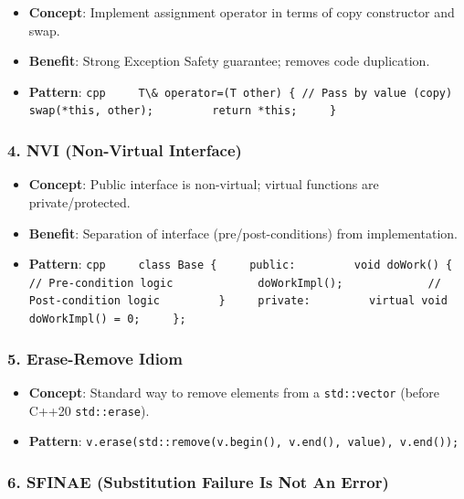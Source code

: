\begin{itemize}
\tightlist
\item
  \textbf{Concept}: Implement assignment operator in terms of copy
  constructor and swap.
\item
  \textbf{Benefit}: Strong Exception Safety guarantee; removes code
  duplication.
\item
  \textbf{Pattern}:
  \passthrough{\lstinline!cpp     T\& operator=(T other) \{ // Pass by value (copy)         swap(*this, other);         return *this;     \}!}
\end{itemize}

\hypertarget{nvi-non-virtual-interface}{%
\subsubsection{4. NVI (Non-Virtual
Interface)}\label{nvi-non-virtual-interface}}

\begin{itemize}
\tightlist
\item
  \textbf{Concept}: Public interface is non-virtual; virtual functions
  are private/protected.
\item
  \textbf{Benefit}: Separation of interface (pre/post-conditions) from
  implementation.
\item
  \textbf{Pattern}:
  \passthrough{\lstinline!cpp     class Base \{     public:         void doWork() \{             // Pre-condition logic             doWorkImpl();             // Post-condition logic         \}     private:         virtual void doWorkImpl() = 0;     \};!}
\end{itemize}

\hypertarget{erase-remove-idiom}{%
\subsubsection{5. Erase-Remove Idiom}\label{erase-remove-idiom}}

\begin{itemize}
\tightlist
\item
  \textbf{Concept}: Standard way to remove elements from a
  \passthrough{\lstinline!std::vector!} (before C++20
  \passthrough{\lstinline!std::erase!}).
\item
  \textbf{Pattern}:
  \passthrough{\lstinline!v.erase(std::remove(v.begin(), v.end(), value), v.end());!}
\end{itemize}

\hypertarget{sfinae-substitution-failure-is-not-an-error}{%
\subsubsection{6. SFINAE (Substitution Failure Is Not An
Error)}\label{sfinae-substitution-failure-is-not-an-error}}

